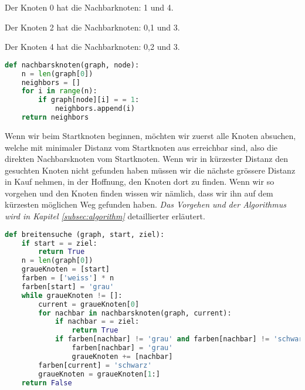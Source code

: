 \begin{lsg}
Der Knoten 0 hat die Nachbarknoten: 1 und 4.

Der Knoten 2 hat die Nachbarknoten: 0,1 und 3.

Der Knoten 4 hat die Nachbarknoten: 0,2 und 3.

\end{lsg}


\begin{lsg}
\hfill
\begin{lstlisting}[language=Python,basicstyle=\small,tabsize=3]
def nachbarsknoten(graph, node):
	n = len(graph[0])
	neighbors = []
	for i in range(n):
		if graph[node][i] = = 1:
			neighbors.append(i)
	return neighbors
\end{lstlisting}
\end{lsg}





\begin{lsg}
Wenn wir beim Startknoten beginnen, m\"ochten wir zuerst alle Knoten absuchen, welche mit minimaler Distanz vom Startknoten aus erreichbar sind, also die direkten Nachbarsknoten vom Startknoten. Wenn wir in k\"urzester Distanz den gesuchten Knoten nicht gefunden haben m\"ussen wir die n\"achste gr\"ossere Distanz in Kauf nehmen, in der Hoffnung, den Knoten dort zu finden. Wenn wir so vorgehen und den Knoten finden wissen wir n\"amlich, dass wir ihn auf dem k\"urzesten m\"oglichen Weg gefunden haben.
\textit{Das Vorgehen und der Algorithmus wird in Kapitel \ref{subsec:algorithm}} detaillierter erl\"autert.
\end{lsg}

\begin{lsg}
\hfill
\begin{lstlisting}[language=Python,basicstyle=\small,tabsize=3]
def breitensuche (graph, start, ziel):
	if start = = ziel:
		return True
	n = len(graph[0])
	graueKnoten = [start]
	farben = ['weiss'] * n
	farben[start] = 'grau'
	while graueKnoten != []:
		current = graueKnoten[0]
		for nachbar in nachbarsknoten(graph, current):
			if nachbar = = ziel:
				return True
			if farben[nachbar] != 'grau' and farben[nachbar] != 'schwarz':
				farben[nachbar] = 'grau'
				graueKnoten += [nachbar]
		farben[current] = 'schwarz'
		graueKnoten = graueKnoten[1:]
	return False
\end{lstlisting}
\end{lsg}

